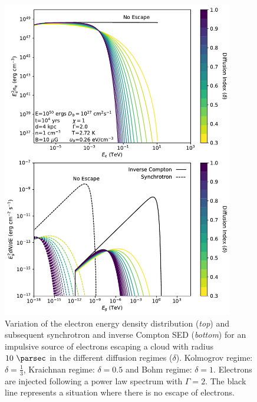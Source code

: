 \begin{figure}[hbtp]
    \centering
    \includegraphics[width=0.9\textwidth]{07_Particle_Evolution/Images/Code/diffusion_regimes_impulsive.pdf}
    \caption{Variation of the electron energy density distribution (\textit{top}) and subsequent synchrotron and inverse Compton SED (\textit{bottom}) for an impulsive source of electrons escaping a cloud with radius $10~\pc$ in the different diffusion regimes ($\delta$). Kolmogrov regime: $\delta=\frac{1}{3}$, Kraichnan regime: $\delta=0.5$ and Bohm regime: $\delta=1$. Electrons are injected following a power law spectrum with $\Gamma=2$. The black line represents a situation where there is no escape of electrons.}
    \label{fig:chapter_7_newsedprod_diffusion_regimes_impulsive}
\end{figure}

